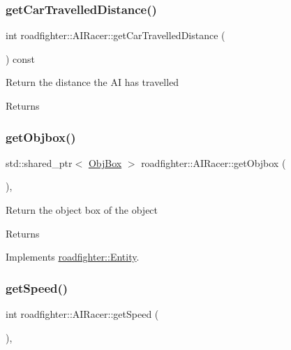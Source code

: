 \subsubsection{\texorpdfstring{get\+Car\+Travelled\+Distance()}{getCarTravelledDistance()}}
{\footnotesize\ttfamily int roadfighter\+::\+A\+I\+Racer\+::get\+Car\+Travelled\+Distance (\begin{DoxyParamCaption}{ }\end{DoxyParamCaption}) const}

Return the distance the AI has travelled \begin{DoxyReturn}{Returns}

\end{DoxyReturn}
\mbox{\label{classroadfighter_1_1AIRacer_a597fa189f88db3ca1534ddf24bb51c22}} 
\subsubsection{\texorpdfstring{get\+Objbox()}{getObjbox()}}
{\footnotesize\ttfamily std\+::shared\+\_\+ptr$<$ \hyperlink{structObjBox}{Obj\+Box} $>$ roadfighter\+::\+A\+I\+Racer\+::get\+Objbox (\begin{DoxyParamCaption}{ }\end{DoxyParamCaption})\hspace{0.3cm}{\ttfamily [override]}, {\ttfamily [virtual]}}

Return the object box of the object \begin{DoxyReturn}{Returns}

\end{DoxyReturn}


Implements \hyperlink{classroadfighter_1_1Entity_af14340d04a725175a6d221f23c35fa0c}{roadfighter\+::\+Entity}.

\mbox{\label{classroadfighter_1_1AIRacer_a4fa90fd500b2e790fb50cc6f1505688f}} 
\subsubsection{\texorpdfstring{get\+Speed()}{getSpeed()}}
{\footnotesize\ttfamily int roadfighter\+::\+A\+I\+Racer\+::get\+Speed (\begin{DoxyParamCaption}{ }\end{DoxyParamCaption})\hspace{0.3cm}{\ttfamily [override]}, {\ttfamily [virtual]}}

